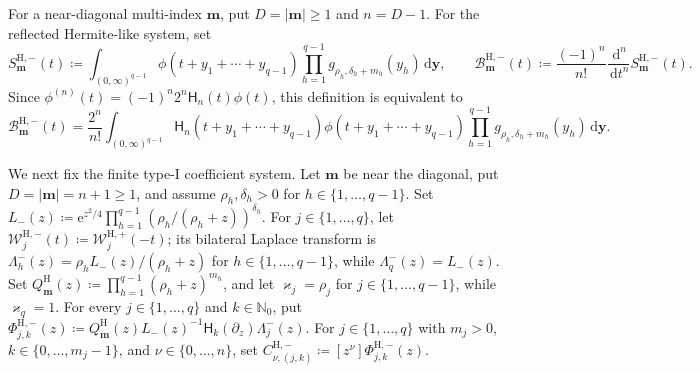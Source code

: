 \documentclass[10pt]{amsart}
\newcommand{\Nzero}{\mathbb N_0}
\newcommand{\e}{\mathrm e}
\newcommand{\dd}{\,\mathrm d}
\newcommand{\mm}{\boldsymbol m}
\newcommand{\abs}[1]{\lvert#1\rvert}
\theoremstyle{plain}
\theoremstyle{definition}
\theoremstyle{remark}
\begin{document}
For a near-diagonal multi-index \(\mm\), put
\(D=\abs\mm\ge1\) and \(n=D-1\).  For the reflected Hermite-like
system, set
\begin{equation}
 S_{\mm}^{\mathrm H,-}(t)
 \coloneq\int_{(0,\infty)^{q-1}}
 \phi(t+y_1+\cdots+y_{q-1})
 \prod_{h=1}^{q-1}g_{\rho_h,\delta_h+m_h}(y_h)\dd\boldsymbol y,
 \qquad
 \mathcal B_{\mm}^{\mathrm H,-}(t)
 \coloneq\frac{(-1)^n}{n!}\frac{\dd^n}{\dd t^n}
 S_{\mm}^{\mathrm H,-}(t).
 \label{eq:Hermite-minus-seed-and-density}
\end{equation}
Since
\(\phi^{(n)}(t)=(-1)^n2^n\mathsf H_n(t)\phi(t)\), this definition is
equivalent to
\begin{equation}
 \mathcal B_{\mm}^{\mathrm H,-}(t)
 =\frac{2^n}{n!}
 \int_{(0,\infty)^{q-1}}
 \mathsf H_n(t+y_1+\cdots+y_{q-1})
 \phi(t+y_1+\cdots+y_{q-1})
 \prod_{h=1}^{q-1}g_{\rho_h,\delta_h+m_h}(y_h)
 \dd\boldsymbol y.
 \label{eq:Hermite-B-kernel-minus}
\end{equation}

We next fix the finite type-I coefficient system.  Let \(\mm\) be near the
diagonal, put \(D=\abs\mm=n+1\ge1\), and assume
\(\rho_h,\delta_h>0\) for \(h\in\{1,\ldots,q-1\}\). Set
\(L_-(z)\coloneq\e^{z^2/4}\prod_{h=1}^{q-1}
\left(\rho_h/(\rho_h+z)\right)^{\delta_h}\).
For \(j\in\{1,\ldots,q\}\), let
\(\mathcal W_j^{\mathrm H,-}(t)\coloneq\mathcal W_j^{\mathrm H,+}(-t)\); its
bilateral Laplace transform is
\(\Lambda_h^-(z)=\rho_hL_-(z)/(\rho_h+z)\) for
\(h\in\{1,\ldots,q-1\}\), while \(\Lambda_q^-(z)=L_-(z)\).
Set \(Q_{\mm}^{\mathrm H}(z)\coloneq\prod_{h=1}^{q-1}(\rho_h+z)^{m_h}\),
and let \(\varkappa_j=\rho_j\) for \(j\in\{1,\ldots,q-1\}\), while
\(\varkappa_q=1\). For every \(j\in\{1,\ldots,q\}\) and
\(k\in\Nzero\), put
\(\Phi_{j,k}^{\mathrm H,-}(z)
\coloneq Q_{\mm}^{\mathrm H}(z)L_-(z)^{-1}
\mathsf H_k(\partial_z)\Lambda_j^-(z)\).
For \(j\in\{1,\ldots,q\}\) with \(m_j>0\),
\(k\in\{0,\ldots,m_j-1\}\), and \(\nu\in\{0,\ldots,n\}\), set
\(C^{\mathrm H,-}_{\nu,(j,k)}\coloneq[z^\nu]
\Phi_{j,k}^{\mathrm H,-}(z)\).
\end{document}
